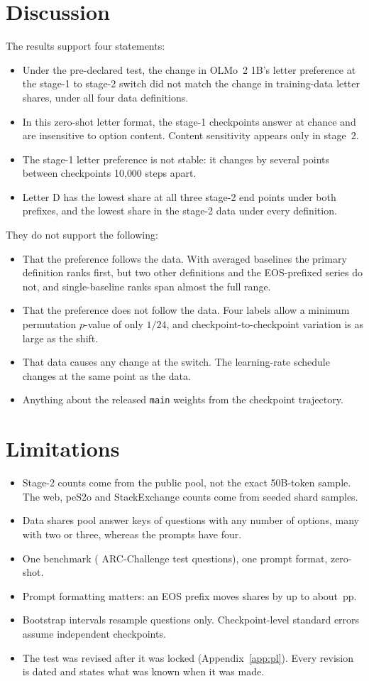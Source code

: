 \documentclass[11pt,a4paper]{article}
\newcommand{\pp}{\,pp}
\begin{document}
\section{Discussion}
The results support four statements:
\begin{itemize}
\item Under the pre-declared test, the change in OLMo~2 1B's letter preference at the stage-1 to stage-2 switch did not match the change in training-data letter shares, under all four data definitions.
\item In this zero-shot letter format, the stage-1 checkpoints answer at chance and are insensitive to option content. Content sensitivity appears only in stage~2.
\item The stage-1 letter preference is not stable: it changes by several points between checkpoints 10{,}000 steps apart.
\item Letter D has the lowest share at all three stage-2 end points under both prefixes, and the lowest share in the stage-2 data under every definition.
\end{itemize}
They do not support the following:
\begin{itemize}
\item That the preference follows the data. With averaged baselines the primary definition ranks first, but two other definitions and the EOS-prefixed series do not, and single-baseline ranks span almost the full range.
\item That the preference does not follow the data. Four labels allow a minimum permutation $p$-value of only $1/24$, and checkpoint-to-checkpoint variation is as large as the shift.
\item That data causes any change at the switch. The learning-rate schedule changes at the same point as the data.
\item Anything about the released \texttt{main} weights from the checkpoint trajectory.
\end{itemize}

\section{Limitations}
\begin{itemize}
\item Stage-2 counts come from the public pool, not the exact 50B-token sample. The web, peS2o and StackExchange counts come from seeded shard samples.
\item Data shares pool answer keys of questions with any number of options, many with two or three, whereas the prompts have four.
\item One benchmark (\NQuestions{} ARC-Challenge test questions), one prompt format, zero-shot.
\item Prompt formatting matters: an EOS prefix moves shares by up to about \EosEffectMax\pp.
\item Bootstrap intervals resample questions only. Checkpoint-level standard errors assume independent checkpoints.
\item The test was revised after it was locked (Appendix~\ref{app:pl}). Every revision is dated and states what was known when it was made.
\end{itemize}
\end{document}
